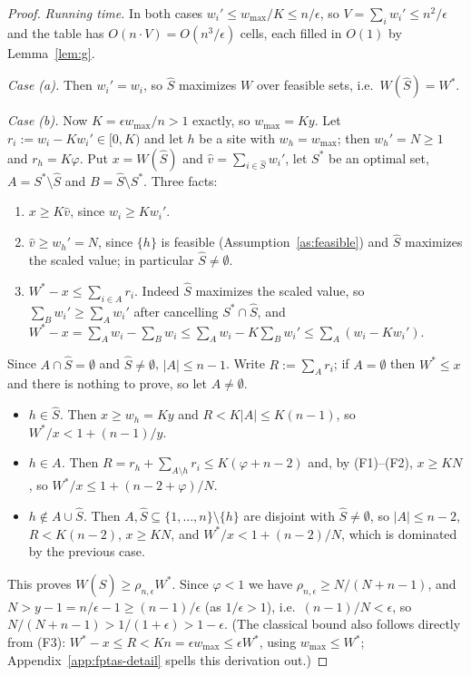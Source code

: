 \documentclass[pdflatex,sn-mathphys-ay]{sn-jnl}
\theoremstyle{thmstyleone}
\theoremstyle{thmstyletwo}
\theoremstyle{thmstylethree}
\begin{document}
\begin{proof}
\emph{Running time.} In both cases $w_i'\le w_{\max}/K\le n/\epsilon$, so
$V=\sum_iw_i'\le n^2/\epsilon$ and the table has $O(n\cdot V)=O(n^3/\epsilon)$
cells, each filled in $O(1)$ by Lemma~\ref{lem:g}.

\emph{Case (a).} Then $w_i'=w_i$, so $\hat S$ maximizes $W$ over feasible
sets, i.e.\ $W(\hat S)=W^\ast$.

\emph{Case (b).} Now $K=\epsilon w_{\max}/n>1$ exactly, so $w_{\max}=Ky$.
Let $r_i:=w_i-Kw_i'\in[0,K)$ and let $h$ be a site with $w_h=w_{\max}$;
then $w_h'=N\ge1$ and $r_h=K\varphi$. Put $x=W(\hat S)$ and
$\hat v=\sum_{i\in\hat S}w_i'$, let $S^\ast$ be an optimal set,
$A=S^\ast\setminus\hat S$ and $B=\hat S\setminus S^\ast$. Three facts:
\begin{enumerate}
\item[(F1)] $x\ge K\hat v$, since $w_i\ge Kw_i'$.
\item[(F2)] $\hat v\ge w_h'=N$, since $\{h\}$ is feasible
(Assumption~\ref{as:feasible}) and $\hat S$ maximizes the scaled value; in
particular $\hat S\ne\emptyset$.
\item[(F3)] $W^\ast-x\le\sum_{i\in A}r_i$. Indeed $\hat S$ maximizes the
scaled value, so $\sum_Bw_i'\ge\sum_Aw_i'$ after cancelling
$S^\ast\cap\hat S$, and $W^\ast-x=\sum_Aw_i-\sum_Bw_i\le\sum_Aw_i-K\sum_Bw_i'
\le\sum_A(w_i-Kw_i')$.
\end{enumerate}
Since $A\cap\hat S=\emptyset$ and $\hat S\ne\emptyset$, $|A|\le n-1$. Write
$R:=\sum_Ar_i$; if $A=\emptyset$ then $W^\ast\le x$ and there is nothing
to prove, so let $A\ne\emptyset$.
\begin{itemize}
\item \emph{$h\in\hat S$.} Then $x\ge w_h=Ky$ and $R<K|A|\le K(n-1)$, so
$W^\ast/x<1+(n-1)/y$.
\item \emph{$h\in A$.} Then $R=r_h+\sum_{A\setminus h}r_i\le K(\varphi+n-2)$ and,
by (F1)--(F2), $x\ge KN$, so $W^\ast/x\le1+(n-2+\varphi)/N$.
\item \emph{$h\notin A\cup\hat S$.} Then $A,\hat S\subseteq\{1,\dots,n\}
\setminus\{h\}$ are disjoint with $\hat S\ne\emptyset$, so $|A|\le n-2$,
$R<K(n-2)$, $x\ge KN$, and $W^\ast/x<1+(n-2)/N$, which is dominated by
the previous case.
\end{itemize}
This proves $W(\hat S)\ge\rho_{n,\epsilon}W^\ast$. Since $\varphi<1$ we have
$\rho_{n,\epsilon}\ge N/(N+n-1)$, and $N>y-1=n/\epsilon-1\ge(n-1)/\epsilon$
(as $1/\epsilon>1$), i.e.\ $(n-1)/N<\epsilon$, so $N/(N+n-1)>1/(1+\epsilon)
>1-\epsilon$. (The classical bound also follows directly from (F3):
$W^\ast-x\le R<Kn=\epsilon w_{\max}\le\epsilon W^\ast$, using
$w_{\max}\le W^\ast$; Appendix~\ref{app:fptas-detail} spells this
derivation out.)
\end{proof}
\end{document}
